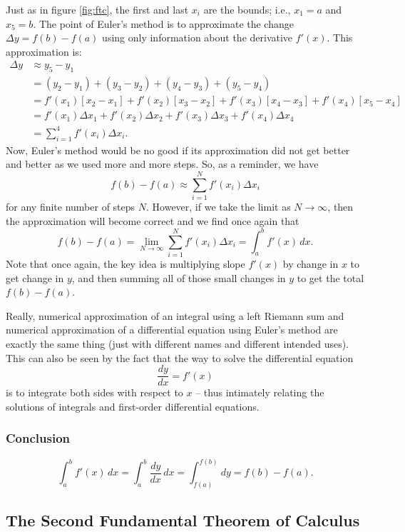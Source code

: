\documentclass{myarticle}
\theoremstyle{nospace}
\newtheorem{old series theorem}{Theorem}
\newenvironment{series theorem}
{\begin{mdframed}\begin{old series theorem}}
    {\end{old series theorem}\end{mdframed}}
\begin{document}
Just as in figure \ref{fig:ftc}, the first and last $x_i$ are the
bounds; i.e., $x_1 = a$ and $x_5 = b$. The point of Euler's method is
to approximate the change $\Delta y = f(b) - f(a)$ using only
information about the derivative $f'(x)$. This approximation
is:
\begin{align*}
  \Delta y
  &\approx y_5 - y_1 \\
  &= (y_2 - y_1)
    + (y_3 - y_2)
    + (y_4 - y_3)
    + (y_5 - y_4) \\
  &= f'(x_1)[x_2 - x_1]
    + f'(x_2)[x_3 - x_2]
    + f'(x_3)[x_4 - x_3]
    + f'(x_4)[x_5 - x_4] \\
  &= f'(x_1)\Delta x_1
    + f'(x_2)\Delta x_2
    + f'(x_3)\Delta x_3
    + f'(x_4)\Delta x_4 \\
  &= \sum_{i=1}^4 f'(x_i)\Delta x_i.
\end{align*}
Now, Euler's method would be no good if its approximation did not get
better and better as we used more and more steps. So, as a reminder,
we have
\[
  f(b) - f(a) \approx \sum_{i=1}^N f'(x_i)\Delta x_i
\]
for any finite number of steps $N$. However, if we take the limit as
$N \to \infty$, then the approximation will become correct and we find
once again that
\[
  f(b) - f(a)
  = \lim_{N \to \infty} \sum_{i=1}^N f'(x_i)\Delta x_i
  = \int_a^b f'(x) \,dx.
\]
Note that once again, the key idea is multiplying slope $f'(x)$ by
change in $x$ to get change in $y$, and then summing all of those
small changes in $y$ to get the total $f(b) - f(a)$.

Really, numerical approximation of an integral using a left Riemann
sum and numerical approximation of a differential equation using
Euler's method are exactly the same thing (just with different names
and different intended uses). This can also be seen by the fact that
the way to solve the differential equation
\[
  \frac{dy}{dx} = f'(x)
\]
is to integrate both sides with respect to $x$ -- thus intimately
relating the solutions of integrals and first-order differential
equations.

\subsubsection{Conclusion}
\label{sec:ftc conclusion}

\[
  \int_a^b f'(x) \,dx
  = \int_a^b \frac{dy}{dx} \,dx
  = \int_{f(a)}^{f(b)} dy
  = f(b) - f(a).
\]

\subsection{The Second Fundamental Theorem of Calculus}
\label{sec:ftc2}
\end{document}
